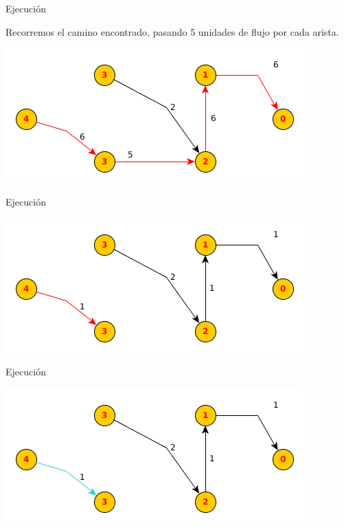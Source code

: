 \documentclass{beamer}
\begin{document}
\begin{frame}{Ejecución}

    Recorremos el camino encontrado, pasando 5 unidades de flujo por cada arista.
    
    \includegraphics[scale=0.6]{dinitz/dinitz24.png}
    
\end{frame}


\begin{frame}{Ejecución}

    
    \includegraphics[scale=0.6]{dinitz/dinitz25.png}
    
\end{frame}

\begin{frame}{Ejecución}

    
    \includegraphics[scale=0.6]{dinitz/dinitz26.png}
    
\end{frame}
\end{document}
